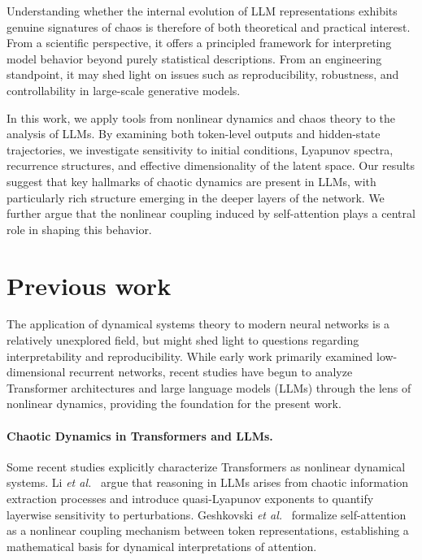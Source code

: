 \documentclass[aip%
 aip,
 amsmath,amssymb,
 reprint,%
]{revtex4-1}
\begin{document}
Understanding whether the internal evolution of LLM representations exhibits genuine signatures of chaos is therefore of both theoretical and practical interest. From a scientific perspective, it offers a principled framework for interpreting model behavior beyond purely statistical descriptions. From an engineering standpoint, it may shed light on issues such as reproducibility, robustness, and controllability in large-scale generative models.

In this work, we apply tools from nonlinear dynamics and chaos theory to the analysis of LLMs. By examining both token-level outputs and hidden-state trajectories, we investigate sensitivity to initial conditions, Lyapunov spectra, recurrence structures, and effective dimensionality of the latent space. Our results suggest that key hallmarks of chaotic dynamics are present in LLMs, with particularly rich structure emerging in the deeper layers of the network. We further argue that the nonlinear coupling induced by self-attention plays a central role in shaping this behavior.

\section{Previous work}\label{sec:prev_work}

The application of dynamical systems theory to modern neural networks is a relatively unexplored field, but might shed light to questions regarding interpretability and reproducibility. While early work primarily examined low-dimensional recurrent networks, recent studies have begun to analyze Transformer architectures and large language models (LLMs) through the lens of nonlinear dynamics, providing the foundation for the present work.

\paragraph{Chaotic Dynamics in Transformers and LLMs.}
Some recent studies explicitly characterize Transformers as nonlinear dynamical systems. Li \textit{et al.}~\cite{li2025cognitive_activation} argue that reasoning in LLMs arises from chaotic information extraction processes and introduce quasi-Lyapunov exponents to quantify layerwise sensitivity to perturbations. Geshkovski \textit{et al.}~\cite{geshkovski2025mathematicalperspectivetransformers} formalize self-attention as a nonlinear coupling mechanism between token representations, establishing a mathematical basis for dynamical interpretations of attention.
\end{document}
